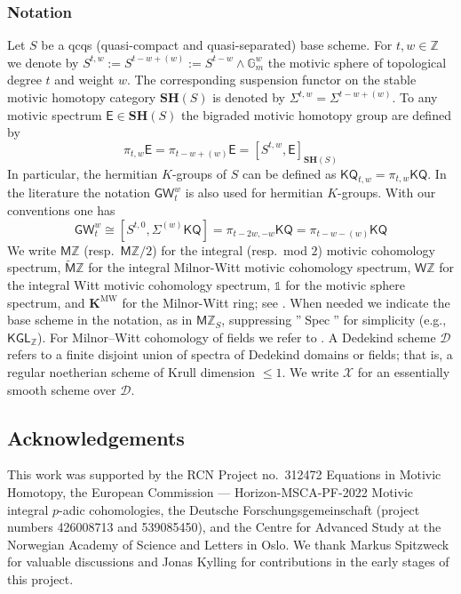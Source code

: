 \documentclass[11pt,hyp,english]{article}
\newcommand{\E}{\mathsf{E}}
\newcommand{\Z}{\mathbb{Z}}
\newcommand{\unit}{\mathds{1}}
\newcommand{\KGL}{\mathsf{KGL}}
\newcommand{\KQ}{\mathsf{KQ}}
\newcommand{\GW}{\mathsf{GW}}
\newcommand{\MZ}{\mathsf{M}\Z}
\newcommand{\HZ}{\mathsf{M}\Z}
\newcommand{\cHZ}{\wt{{\mathsf{M}}}{\Z}}
\newcommand{\HWZ}{\mathsf{W}\Z}
\newcommand{\SH}{\mathbf{SH}}
\newcommand{\Spec}{\operatorname{Spec}}
\newcommand{\wt}[1]{\widetilde{#1}}
\newcommand{\KMW}{\mathbf{K}^\mathrm{MW}}
\theoremstyle{definition}
\begin{document}
\subsubsection*{Notation}
Let $S$ be a qcqs (quasi-compact and quasi-separated) base scheme.
For $t,w\in \Z$ we denote by
$S^{t,w}:=S^{t-w+(w)}:= S^{t-w}\wedge \mathbb{G}_{m}^{w}$ the motivic sphere of 
topological degree $t$ and weight $w$.
The corresponding suspension functor on the stable motivic homotopy category $\SH(S)$ 
is denoted by $\Sigma^{t,w}=\Sigma^{t-w+(w)}$.
To any motivic spectrum $\E\in\SH(S)$ the bigraded motivic homotopy group are defined by 
\[
\pi_{t,w}\E=
\pi_{t-w+(w)}\E=
[S^{t,w},\E]_{\SH(S)}
\]
In particular, 
the hermitian $K$-groups of $S$ can be defined as 
$\KQ_{t,w}=\pi_{t,w}\KQ$.
In the literature the notation $\GW^w_t$ is also used for hermitian $K$-groups. 
With our conventions one has
\[
\GW^{w}_{t}\cong [S^{t,0}, \Sigma^{(w)}\KQ]=\pi_{t-2w,-w}\KQ=\pi_{t-w-(w)}\KQ
\]
We write $\HZ$ (resp.\ $\HZ/2$) for the integral (resp.\ mod $2$) motivic cohomology spectrum, 
$\cHZ$ for the integral Milnor-Witt motivic cohomology spectrum, 
$\HWZ$ for the integral Witt motivic cohomology spectrum, $\unit$ for the motivic sphere spectrum,
and $\KMW$ for the Milnor-Witt ring; 
see \cite{2020arXiv200406634B,MorelICM06}.
When needed we indicate the base scheme in the notation, 
as in $\MZ_S$, suppressing ''$\Spec$'' for simplicity (e.g., $\KGL_\Z$).
For Milnor–Witt cohomology of fields we refer to \cite{deglise2023notesmilnorwittktheory}.
A Dedekind scheme $\mathcal{D}$ refers to a finite disjoint union of spectra of Dedekind 
domains or fields;
that is, a regular noetherian scheme of Krull dimension $\leq 1$.
We write $\mathcal{X}$ for an essentially smooth scheme over $\mathcal{D}$.



\subsection*{Acknowledgements}
This work was supported by the RCN Project no.~312472 Equations in Motivic Homotopy, the European Commission — Horizon-MSCA-PF-2022 Motivic integral $p$-adic cohomologies, the Deutsche Forschungsgemeinschaft (project numbers 426008713 and 539085450), and the Centre for Advanced Study at the Norwegian Academy of Science and Letters in Oslo. We thank Markus Spitzweck for valuable discussions and Jonas Kylling for contributions in the early stages of this project.
\end{document}
